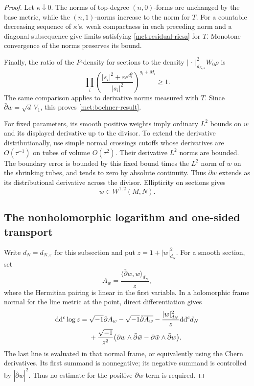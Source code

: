 \begin{proof}
Let \(\kappa\downarrow0\).  The norms of top-degree \((n,0)\)-forms
are unchanged by the base metric, while the \((n,1)\)-norms increase
to the norm for \(T\).  For a countable decreasing sequence of
\(\kappa\)'s, weak compactness in each preceding norm and a diagonal
subsequence give limits satisfying \eqref{met:residual-riesz} for
\(T\).  Monotone convergence of the norms preserves its bound.

Finally, the ratio of the \(P\)-density for sections to the density
\(|\,\cdot\,|_{d_{N,\varepsilon}}^2W_0\rho\) is
\begin{equation}
 \label{met:density-ratio}
 \prod_i\left(
   \frac{|s_i|^2+\varepsilon e^{d_i^0}}{|s_i|^2}
          \right)^{g_i+M_i}\geq1.
\end{equation}
The same comparison applies to derivative norms measured with \(T\).
Since \(\bar\partial w=\sqrt d\,V_1\), this proves
\eqref{met:bochner-result}.

For fixed parameters, its smooth positive weights imply ordinary
\(L^2\) bounds on \(w\) and its displayed derivative up to the
divisor.  To extend the derivative distributionally, use simple
normal crossings cutoffs whose derivatives are \(O(\tau^{-1})\) on
tubes of volume \(O(\tau^2)\).  Their derivative \(L^2\) norms are
bounded.  The boundary error is bounded by this fixed bound times
the \(L^2\) norm of \(w\) on the shrinking tubes, and tends to zero
by absolute continuity.  Thus \(\bar\partial w\) extends as its
distributional derivative across the divisor.  Ellipticity on
sections gives
\begin{equation}
 \label{met:sobolev-extension}
 w\in W^{1,2}(M,N).
\end{equation}

\subsection*{The nonholomorphic logarithm and one-sided transport}

Write \(d_N=d_{N,\varepsilon}\) for this subsection and put
\(z=1+|w|_{d_N}^2\).  For a smooth section, set
\[
 A_w=\frac{\langle\bar\partial w,w\rangle_{d_N}}z,
\]
where the Hermitian pairing is linear in the first variable.  In a
holomorphic frame normal for the line metric at the point, direct
differentiation gives
\begin{equation}
 \label{met:log-identity}
 \begin{split}
 \mathrm{d}\mathrm{d}^{c}\log z={}&\sqrt{-1}\partial A_w
       -\sqrt{-1}\bar\partial\overline{A_w}
       -\frac{|w|_{d_N}^2}{z}\mathrm{d}\mathrm{d}^{c} d_N\\
 &+\frac{\sqrt{-1}}{z^2}
       \bigl(\partial w\wedge\bar\partial\bar w
                 -\partial\bar w\wedge\bar\partial w\bigr).
 \end{split}
\end{equation}
The last line is evaluated in that normal frame, or equivalently
using the Chern derivatives.  Its first summand is nonnegative; its
negative summand is controlled by \(|\bar\partial w|^2\).  Thus no
estimate for the positive \(\partial w\) term is required.


\end{proof}
